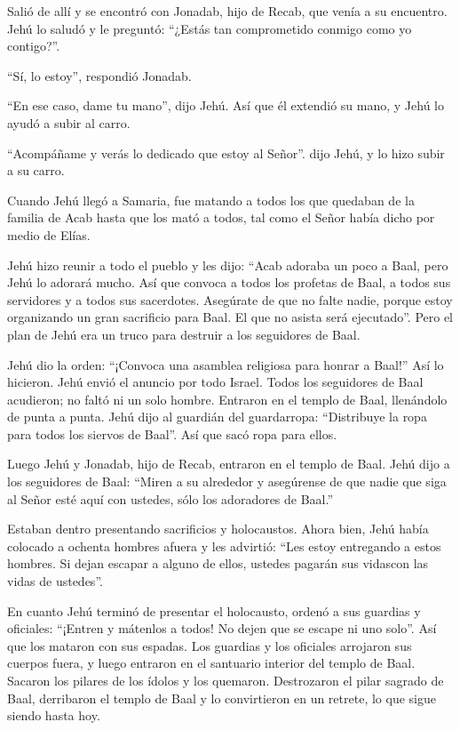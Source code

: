  Salió de allí y se encontró con Jonadab, hijo de Recab,
que venía a su encuentro. Jehú lo saludó y le preguntó: ``¿Estás tan
comprometido conmigo como yo contigo?''.

``Sí, lo estoy'', respondió Jonadab.

``En ese caso, dame tu mano'', dijo Jehú. Así que él extendió su mano, y
Jehú lo ayudó a subir al carro.

 ``Acompáñame y verás lo dedicado que estoy al Señor''.
dijo Jehú, y lo hizo subir a su carro.

 Cuando Jehú llegó a Samaria, fue matando a todos los que
quedaban de la familia de Acab hasta que los mató a todos, tal como el
Señor había dicho por medio de Elías.

 Jehú hizo reunir a todo el pueblo y les dijo: ``Acab
adoraba un poco a Baal, pero Jehú lo adorará mucho.  Así
que convoca a todos los profetas de Baal, a todos sus servidores y a
todos sus sacerdotes. Asegúrate de que no falte nadie, porque estoy
organizando un gran sacrificio para Baal. El que no asista será
ejecutado''. Pero el plan de Jehú era un truco para destruir a los
seguidores de Baal.

 Jehú dio la orden: ``¡Convoca una asamblea religiosa para
honrar a Baal!'' Así lo hicieron.  Jehú envió el anuncio
por todo Israel. Todos los seguidores de Baal acudieron; no faltó ni un
solo hombre. Entraron en el templo de Baal, llenándolo de punta a punta.
 Jehú dijo al guardián del guardarropa: ``Distribuye la
ropa para todos los siervos de Baal''. Así que sacó ropa para ellos.

 Luego Jehú y Jonadab, hijo de Recab, entraron en el templo
de Baal. Jehú dijo a los seguidores de Baal: ``Miren a su alrededor y
asegúrense de que nadie que siga al Señor esté aquí con ustedes, sólo
los adoradores de Baal.''

 Estaban dentro presentando sacrificios y holocaustos.
Ahora bien, Jehú había colocado a ochenta hombres afuera y les advirtió:
``Les estoy entregando a estos hombres. Si dejan escapar a alguno de
ellos, ustedes pagarán sus vidascon las vidas de ustedes''.

 En cuanto Jehú terminó de presentar el holocausto, ordenó
a sus guardias y oficiales: ``¡Entren y mátenlos a todos! No dejen que
se escape ni uno solo''. Así que los mataron con sus espadas. Los
guardias y los oficiales arrojaron sus cuerpos fuera, y luego entraron
en el santuario interior del templo de Baal.  Sacaron los
pilares de los ídolos y los quemaron.  Destrozaron el pilar
sagrado de Baal, derribaron el templo de Baal y lo convirtieron en un
retrete, lo que sigue siendo hasta hoy.

